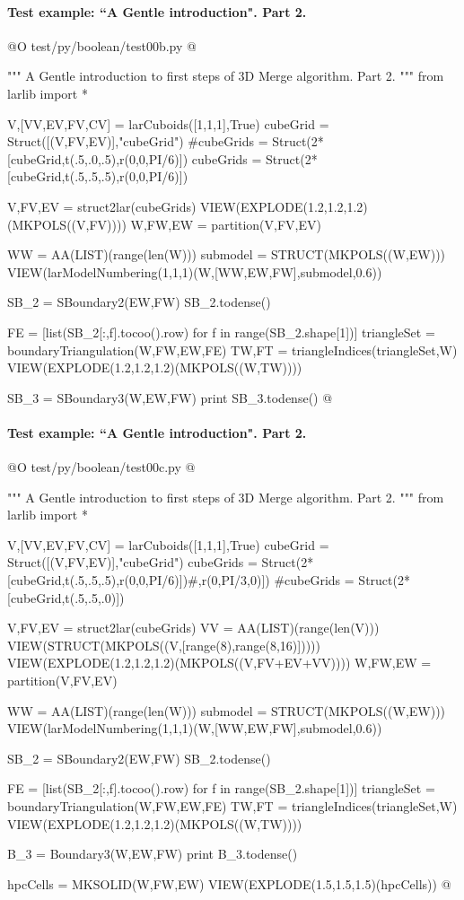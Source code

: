 \documentclass[11pt,oneside]{article}    %
\begin{document}
\paragraph{Test example: ``A Gentle introduction". Part 2.}
@O test/py/boolean/test00b.py
@{""" A Gentle introduction to first steps of 3D Merge algorithm. Part 2. """
from larlib import *

V,[VV,EV,FV,CV] = larCuboids([1,1,1],True)
cubeGrid = Struct([(V,FV,EV)],"cubeGrid")
#cubeGrids = Struct(2*[cubeGrid,t(.5,.0,.5),r(0,0,PI/6)])
cubeGrids = Struct(2*[cubeGrid,t(.5,.5,.5),r(0,0,PI/6)])

V,FV,EV = struct2lar(cubeGrids)
VIEW(EXPLODE(1.2,1.2,1.2)(MKPOLS((V,FV))))
W,FW,EW = partition(V,FV,EV)

WW = AA(LIST)(range(len(W)))
submodel = STRUCT(MKPOLS((W,EW)))
VIEW(larModelNumbering(1,1,1)(W,[WW,EW,FW],submodel,0.6)) 

SB_2 = SBoundary2(EW,FW)
SB_2.todense()

FE = [list(SB_2[:,f].tocoo().row) for f in range(SB_2.shape[1])]
triangleSet = boundaryTriangulation(W,FW,EW,FE)
TW,FT = triangleIndices(triangleSet,W)
VIEW(EXPLODE(1.2,1.2,1.2)(MKPOLS((W,TW))))

SB_3 = SBoundary3(W,EW,FW)
print SB_3.todense()
@}



\paragraph{Test example: ``A Gentle introduction". Part 2.}
@O test/py/boolean/test00c.py
@{""" A Gentle introduction to first steps of 3D Merge algorithm. Part 2. """
from larlib import * 

V,[VV,EV,FV,CV] = larCuboids([1,1,1],True)
cubeGrid = Struct([(V,FV,EV)],"cubeGrid")
cubeGrids = Struct(2*[cubeGrid,t(.5,.5,.5),r(0,0,PI/6)])#,r(0,PI/3,0)])
#cubeGrids = Struct(2*[cubeGrid,t(.5,.5,.0)])

V,FV,EV = struct2lar(cubeGrids)
VV = AA(LIST)(range(len(V)))
VIEW(STRUCT(MKPOLS((V,[range(8),range(8,16)]))))
VIEW(EXPLODE(1.2,1.2,1.2)(MKPOLS((V,FV+EV+VV))))
W,FW,EW = partition(V,FV,EV)

WW = AA(LIST)(range(len(W)))
submodel = STRUCT(MKPOLS((W,EW)))
VIEW(larModelNumbering(1,1,1)(W,[WW,EW,FW],submodel,0.6)) 

SB_2 = SBoundary2(EW,FW)
SB_2.todense()

FE = [list(SB_2[:,f].tocoo().row) for f in range(SB_2.shape[1])]
triangleSet = boundaryTriangulation(W,FW,EW,FE)
TW,FT = triangleIndices(triangleSet,W)
VIEW(EXPLODE(1.2,1.2,1.2)(MKPOLS((W,TW))))

B_3 = Boundary3(W,EW,FW)
print B_3.todense()

hpcCells = MKSOLID(W,FW,EW)
VIEW(EXPLODE(1.5,1.5,1.5)(hpcCells))
@}






\end{document}
